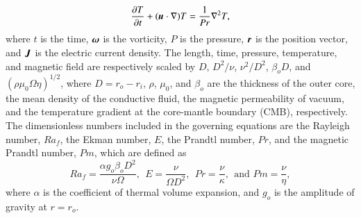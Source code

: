 %
\begin{equation}
\frac{\partial T}{\partial t} 
 + ( \mbox{\boldmath$u$} \cdot \nabla ) T =
 \frac{1}{Pr} \nabla^2 T ,
\label{eq:heat}
\end{equation}
%
where $t$ is the time, $\mbox{\boldmath$\omega$}$ is the vorticity, $P$ is the pressure, $\mbox{\boldmath$r$}$ is the position vector, and $\mbox{\boldmath$J$}$ is the electric current density.
The length, time, pressure, temperature, and magnetic field are respectively scaled by $D$, $D^2/\nu$, $\nu^2 /D^2$, $\beta_o D$, and $(\rho \mu_0 \Omega \eta )^{1/2}$,
where $D = r_o - r_i$, $\rho$, $\mu_0$, and $\beta_o$ are the thickness of the outer core, the mean density of the 
conductive fluid, the magnetic permeability of vacuum, and the temperature gradient at the core-mantle boundary (CMB), respectively.
The dimensionless numbers included in the governing equations are the Rayleigh number, $Ra_f$, the Ekman number, $E$, the Prandtl number, $Pr$, and the magnetic Prandtl number, $Pm$, which are defined as
%
\begin{equation}
Ra_f = \frac{\alpha g_o \beta_o D^{2}}{\nu \Omega},~~
E = \frac{\nu}{\Omega D^2},~~
Pr = \frac{\nu}{\kappa},~~ \mbox{and \ }
Pm = \frac{\nu}{\eta},
\label{eq:dimensionless_numbers}
\end{equation}
%
where $\alpha$ is the coefficient of thermal volume expansion, and $g_o$ is the amplitude of gravity at $r = r_o$.

